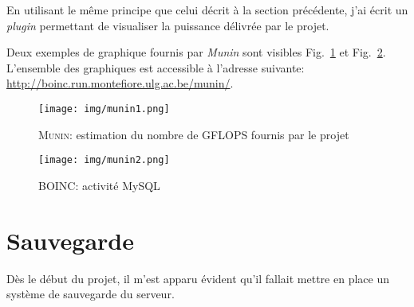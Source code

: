 \documentclass[a4paper, 12pt]{report}
\begin{document}
En utilisant le même principe que celui décrit à la section précédente, j'ai écrit un \textit{plugin} permettant de visualiser la puissance délivrée par le projet.

Deux exemples de graphique fournis par \textit{Munin} sont visibles Fig.~\ref{munin1} et Fig.~\ref{munin2}. L'ensemble des graphiques est accessible à l'adresse suivante: \url{http://boinc.run.montefiore.ulg.ac.be/munin/}.

\begin{figure}[!tb]
\centering
\texttt{[image: img/munin1.png]}
\caption{\textsc{Munin}: estimation du nombre de GFLOPS fournis par le projet}
\label{munin1}
\end{figure}

\begin{figure}[!tb]
\centering
\texttt{[image: img/munin2.png]}
\caption{\textsc{BOINC}: activité MySQL}
\label{munin2}
\end{figure}


\section{Sauvegarde}
Dès le début du projet, il m'est apparu évident qu'il fallait mettre en place un système de sauvegarde du serveur.
\end{document}
